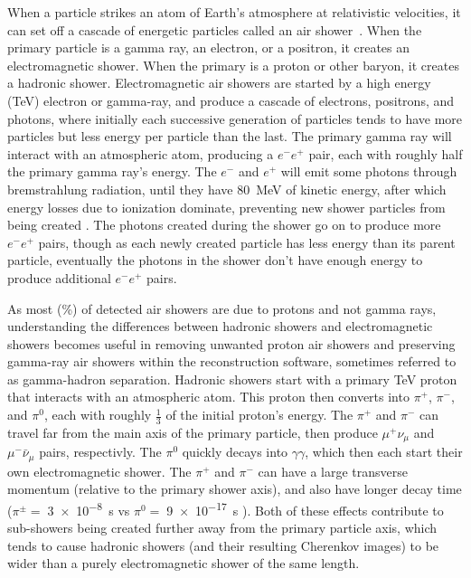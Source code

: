   When a particle strikes an atom of Earth's atmosphere at relativistic velocities, it can set off a cascade of energetic particles called an air shower~\cite{Bethe1934,Klein1999}.
  When the primary particle is a gamma ray, an electron, or a positron, it creates an electromagnetic shower.
  When the primary is a proton or other baryon, it creates a hadronic shower.
  Electromagnetic air showers are started by a high energy (\nicetilde TeV) electron or gamma-ray, and produce a cascade of electrons, positrons, and photons, where initially each successive generation of particles tends to have more particles but less energy per particle than the last.
  The primary gamma ray will interact with an atmospheric atom, producing a $e^{-}e^{+}$ pair, each with roughly half the primary gamma ray's energy.
  The $e^{-}$ and $e^{+}$ will emit some photons through bremstrahlung radiation, until they have \nicetilde \SI{80}{MeV} of kinetic energy, after which energy losses due to ionization dominate, preventing new shower particles from being created \cite{pdg_2014}.
  The photons created during the shower go on to produce more $e^{-}e^{+}$ pairs, though as each newly created particle has less energy than its parent particle, eventually the photons in the shower don't have enough energy to produce additional $e^{-}e^{+}$ pairs.

  As most (\%) of detected air showers are due to protons and not gamma rays, understanding the differences between hadronic showers and electromagnetic showers becomes useful in removing unwanted proton air showers and preserving gamma-ray air showers within the reconstruction software, sometimes referred to as gamma-hadron separation.
  Hadronic showers start with a primary \nicetilde TeV proton that interacts with an atmospheric atom.
  This proton then converts into $\pi^{+}$, $\pi^{-}$, and $\pi^{0}$, each with roughly \nicetilde $\frac{1}{3}$ of the initial proton's energy.
  The $\pi^{+}$ and $\pi^{-}$ can travel far from the main axis of the primary particle, then produce $\mu^{+}\nu_{\mu}$ and $\mu^{-}\bar{\nu}_{\mu}$ pairs, respectivly.
  The $\pi^{0}$ quickly decays into $\gamma\gamma$, which then each start their own electromagnetic shower.
  The $\pi^{+}$ and $\pi^{-}$ can have a large transverse momentum (relative to the primary shower axis), and also have longer decay time ($\pi^{\pm}=\;$\SI{3e-8}{s} vs $\pi^{0}=\;$\SI{9e-17}{s} \cite{pdg_2014} ).
  Both of these effects contribute to sub-showers being created further away from the primary particle axis, which tends to cause hadronic showers (and their resulting Cherenkov images) to be wider than a purely electromagnetic shower of the same length. 


